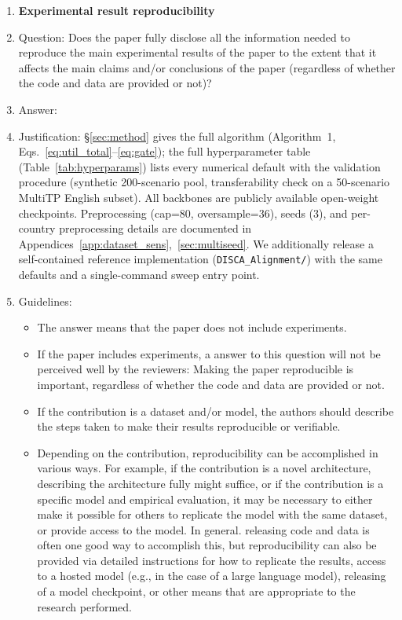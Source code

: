\begin{enumerate}
    \item {\bf Experimental result reproducibility}
    \item[] Question: Does the paper fully disclose all the information needed to reproduce the main experimental results of the paper to the extent that it affects the main claims and/or conclusions of the paper (regardless of whether the code and data are provided or not)?
    \item[] Answer: \answerYes{}
    \item[] Justification: \S\ref{sec:method} gives the full algorithm (Algorithm~1, Eqs.~\ref{eq:util_total}--\ref{eq:gate}); the full hyperparameter table (Table~\ref{tab:hyperparams}) lists every numerical default with the validation procedure (synthetic 200-scenario pool, transferability check on a 50-scenario MultiTP English subset). All backbones are publicly available open-weight checkpoints. Preprocessing (cap=80, oversample=36), seeds (3), and per-country preprocessing details are documented in Appendices~\ref{app:dataset_sens},~\ref{sec:multiseed}. We additionally release a self-contained reference implementation (\texttt{DISCA\_Alignment/}) with the same defaults and a single-command sweep entry point.
    \item[] Guidelines:
    \begin{itemize}
        \item The answer \answerNA{} means that the paper does not include experiments.
        \item If the paper includes experiments, a \answerNo{} answer to this question will not be perceived well by the reviewers: Making the paper reproducible is important, regardless of whether the code and data are provided or not.
        \item If the contribution is a dataset and\slash or model, the authors should describe the steps taken to make their results reproducible or verifiable. 
        \item Depending on the contribution, reproducibility can be accomplished in various ways. For example, if the contribution is a novel architecture, describing the architecture fully might suffice, or if the contribution is a specific model and empirical evaluation, it may be necessary to either make it possible for others to replicate the model with the same dataset, or provide access to the model. In general. releasing code and data is often one good way to accomplish this, but reproducibility can also be provided via detailed instructions for how to replicate the results, access to a hosted model (e.g., in the case of a large language model), releasing of a model checkpoint, or other means that are appropriate to the research performed.

\end{itemize}
\end{enumerate}
